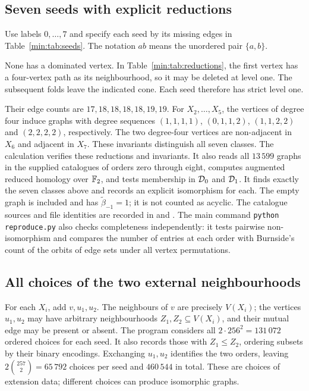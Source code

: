 \subsection{Seven seeds with explicit reductions}
Use labels $0,\ldots,7$ and specify each seed by its missing edges in
Table~\ref{min:tab:seeds}. The notation $ab$ means the unordered pair $\{a,b\}$.
\begin{table}[htbp]
\centering\small
\caption{The seven eight-vertex seeds, specified by their missing edges.}\label{min:tab:seeds}

\end{table}
None has a dominated vertex. In Table~\ref{min:tab:reductions}, the first
vertex has a four-vertex path as its neighbourhood, so it may be deleted at
level one. The subsequent folds leave the indicated cone. Each seed
therefore has strict level one.
\begin{table}[htbp]
\centering\small
\caption{First deletions and folds of the seven seeds. Paths list the
neighbours in path order; folds take place after the first deletion.}\label{min:tab:reductions}

\end{table}
Their edge counts are $17,18,18,18,18,19,19$. For $X_2,\ldots,X_5$, the
vertices of degree four induce graphs with degree sequences
$(1,1,1,1)$, $(0,1,1,2)$, $(1,1,2,2)$ and $(2,2,2,2)$, respectively.
The two degree-four vertices are non-adjacent in $X_6$ and adjacent in $X_7$.
These invariants distinguish all seven classes.
The calculation verifies these reductions and invariants. It also reads all
$13\,599$ graphs in the supplied catalogues of orders zero through eight,
computes augmented reduced homology over $\mathbb F_2$, and tests membership in
$\mathcal D_0$ and $\mathcal D_1$. It finds exactly the seven classes above and records an
explicit isomorphism for each. The empty graph is included and has
$\widetilde\beta_{-1}=1$; it is not counted as acyclic.
The catalogue sources and file identities are recorded in
 and .
The main command \texttt{python reproduce.py} also checks completeness
independently: it tests pairwise non-isomorphism and compares the number of
entries at each order with Burnside's count of the orbits of edge sets under
all vertex permutations.

\subsection{All choices of the two external neighbourhoods}
For each $X_i$, add $v,u_1,u_2$. The neighbours of $v$ are precisely
$V(X_i)$; the vertices $u_1,u_2$ may have arbitrary neighbourhoods
$Z_1,Z_2\subseteq V(X_i)$, and their mutual edge may be present or absent.
The program considers all $2\cdot256^2=131\,072$ ordered choices for each
seed. It also records those with $Z_1\leq Z_2$, ordering subsets by their
binary encodings. Exchanging $u_1,u_2$ identifies the two orders, leaving
$2\binom{257}{2}=65\,792$ choices per seed and $460\,544$ in total.
These are choices of extension data; different choices can produce
isomorphic graphs.

